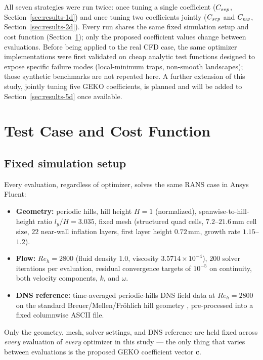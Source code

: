 All seven strategies were run twice: once tuning a single coefficient ($C_{sep}$,
Section~\ref{sec:results-1d}) and once tuning two coefficients jointly ($C_{sep}$ and
$C_{nw}$, Section~\ref{sec:results-2d}). Every run shares the same fixed simulation
setup and cost function (Section~\ref{sec:costfn}); only the proposed coefficient
values change between evaluations. Before being applied to the real CFD case, the
same optimizer implementations were first validated on cheap analytic test
functions designed to expose specific failure modes (local-minimum traps,
non-smooth landscapes); those synthetic benchmarks are not repeated here. A
further extension of this study, jointly tuning five GEKO coefficients, is
planned and will be added to Section~\ref{sec:results-5d} once available.

\section{Test Case and Cost Function}
\label{sec:costfn}

\subsection{Fixed simulation setup}

Every evaluation, regardless of optimizer, solves the same RANS case in Ansys
Fluent:

\begin{itemize}
  \item \textbf{Geometry:} periodic hills, hill height $H=1$ (normalized),
        spanwise-to-hill-height ratio $l_y/H = 3.035$, fixed mesh (structured
        quad cells, $7.2$--$21.6\,\mathrm{mm}$ cell size, $22$ near-wall
        inflation layers, first layer height $0.72\,\mathrm{mm}$, growth rate
        $1.15$--$1.2$).
  \item \textbf{Flow:} $Re_h = 2800$ (fluid density $1.0$, viscosity
        $3.5714\times10^{-4}$), $200$ solver iterations per evaluation, residual
        convergence targets of $10^{-5}$ on continuity, both velocity
        components, $k$, and $\omega$.
  \item \textbf{DNS reference:} time-averaged periodic-hills DNS field data at
        $Re_h=2800$ on the standard Breuer/Mellen/Fr\"ohlich hill geometry
        \cite{breuer2009}, pre-processed into a fixed columnwise ASCII file.
\end{itemize}

Only the geometry, mesh, solver settings, and DNS reference are held fixed across
\emph{every} evaluation of \emph{every} optimizer in this study --- the only thing
that varies between evaluations is the proposed GEKO coefficient vector
$\mathbf{c}$.

